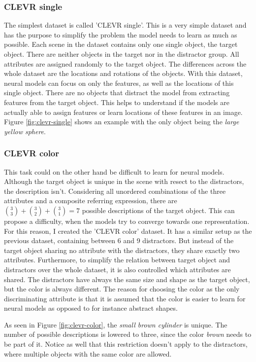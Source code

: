 \subsubsection*{CLEVR single}
The simplest dataset is called 'CLEVR single'.
This is a very simple dataset and has the purpose to simplify the problem the model needs to learn as much as possible.
Each scene in the dataset contains only one single object, the target object.
There are neither objects in the target nor in the distractor group.
All attributes are assigned randomly to the target object.
The differences across the whole dataset are the locations and rotations of the objects.
With this dataset, neural models can focus on only the features, as well as the locations of this single object.
There are no objects that distract the model from extracting features from the target object.
This helps to understand if the models are actually able to assign features or learn locations of these features in an image.
Figure \ref{fig:clevr-single} shows an example with the only object being the \emph{large yellow sphere}.

\subsubsection*{CLEVR color}
This task could on the other hand be difficult to learn for neural models.
Although the target object is unique in the scene with resect to the distractors, the description isn't.
Considering all unordered combinations of the three attributes and a composite referring expression, there are $\binom{3}{3} + \binom{3}{2} + \binom{3}{1} = 7$ possible descriptions of the target object.
This can propose a difficulty, when the models try to converge towards one representation.
For this reason, I created the 'CLEVR color' dataset.
It has a similar setup as the previous dataset, containing between 6 and 9 distractors.
But instead of the target object sharing no attribute with the distractors, they share exactly two attributes.
Furthermore, to simplify the relation between target object and distractors over the whole dataset, it is also controlled which attributes are shared.
The distractors have always the same size and shape as the target object, but the color is always different.
The reason for choosing the color as the only discriminating attribute is that it is assumed that the color is easier to learn for neural models as opposed to for instance abstract shapes.

As seen in Figure \ref{fig:clevr-color}, the \emph{small brown cylinder} is unique.
The number of possible descriptions is lowered to three, since the color \emph{brown} needs to be part of it.
Notice as well that this restriction doesn't apply to the distractors, where multiple objects with the same color are allowed.


